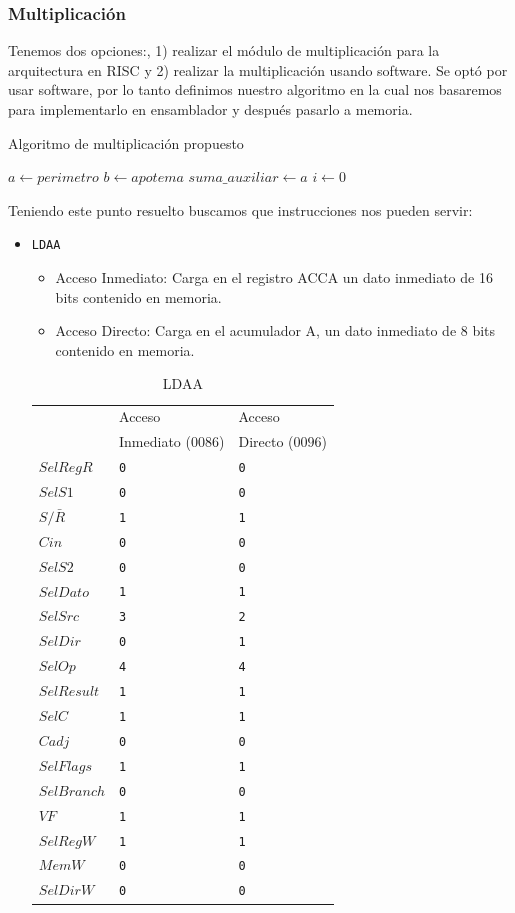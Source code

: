 \documentclass{IEEEtran}
\begin{document}
\subsubsection{Multiplicación}
\label{sec:org7f6ef21}
Tenemos dos opciones:, 1) realizar el módulo de multiplicación para la arquitectura en RISC y 2) realizar la multiplicación usando software. Se optó por usar software, por lo tanto definimos nuestro algoritmo en la cual nos basaremos para implementarlo en ensamblador y después pasarlo a memoria.
\begin{algorithm}
\caption{Algoritmo de multiplicación propuesto}
$a \gets perimetro$\;
$b \gets apotema$\;
$suma\_auxiliar \gets a$\;
$i \gets 0$\;
\end{algorithm}
Teniendo este punto resuelto buscamos que instrucciones nos pueden servir\cite[pp. 24-26]{PM1999}:
\begin{itemize}
\item \texttt{LDAA}
\begin{itemize}
\item Acceso Inmediato: Carga en el registro ACCA un dato inmediato de 16 bits contenido en memoria.
\item Acceso Directo: Carga en el acumulador A, un dato inmediato de 8 bits contenido en memoria.
\end{itemize}
\begin{table}[htbp]
\caption{LDAA}
\centering
\begin{tabular}{lll}
\hline
 & Acceso & Acceso\\
 & Inmediato (\(0086\)) & Directo (\(0096\))\\
\hline
\(SelRegR\) & \texttt{0} & \texttt{0}\\
\(SelS1\) & \texttt{0} & \texttt{0}\\
\(S/\bar{R}\) & \texttt{1} & \texttt{1}\\
\(Cin\) & \texttt{0} & \texttt{0}\\
\(SelS2\) & \texttt{0} & \texttt{0}\\
\(SelDato\) & \texttt{1} & \texttt{1}\\
\(SelSrc\) & \texttt{3} & \texttt{2}\\
\(SelDir\) & \texttt{0} & \texttt{1}\\
\(SelOp\) & \texttt{4} & \texttt{4}\\
\(SelResult\) & \texttt{1} & \texttt{1}\\
\(SelC\) & \texttt{1} & \texttt{1}\\
\(Cadj\) & \texttt{0} & \texttt{0}\\
\(SelFlags\) & \texttt{1} & \texttt{1}\\
\(SelBranch\) & \texttt{0} & \texttt{0}\\
\(VF\) & \texttt{1} & \texttt{1}\\
\(SelRegW\) & \texttt{1} & \texttt{1}\\
\(MemW\) & \texttt{0} & \texttt{0}\\
\(SelDirW\) & \texttt{0} & \texttt{0}\\
\hline
\end{tabular}
\end{table}
\end{itemize}
\end{document}
